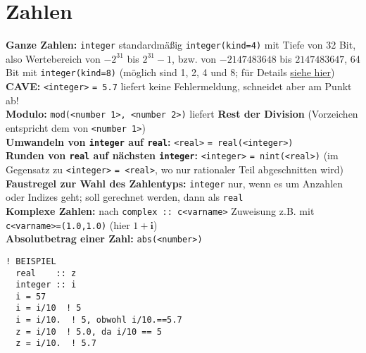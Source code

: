 \documentclass[a4paper, twocolumn]{scrarticle}
\begin{document}
\section{Zahlen}
\textbf{Ganze Zahlen:} \lstinline|integer| standardmäßig \lstinline|integer(kind=4)| mit Tiefe von 32 Bit, also Wertebereich von $-2^{31}$ bis $2^{31}-1$, bzw. von $-2147483648$ bis $2147483647$, 64 Bit mit \lstinline|integer(kind=8)| (möglich sind 1, 2, 4 und 8; für Details \href{http://earth.uni-muenster.de/~joergs/doc/f90/unix-um/dfum_034.html}{siehe hier})\\
\textbf{CAVE:} \lstinline|<integer>| \lstinline|= 5.7| liefert keine Fehlermeldung, schneidet aber am Punkt ab!\\
\textbf{Modulo:} \lstinline|mod(<number 1>, <number 2>)| liefert \textbf{Rest der Division} (Vorzeichen entspricht dem von \lstinline|<number 1>|) \\
\textbf{Umwandeln von \lstinline|integer| auf \lstinline|real|:} \lstinline|<real>| \lstinline|= real(<integer>)|\\
\textbf{Runden von \lstinline|real| auf nächsten \lstinline|integer|:} \lstinline|<integer>| \lstinline|= nint(<real>)| (im Gegensatz zu \lstinline|<integer>| \lstinline|= <real>|, wo nur rationaler Teil abgeschnitten wird)\\
\textbf{Faustregel zur Wahl des Zahlentyps:} \lstinline|integer| nur, wenn es um Anzahlen oder Indizes geht; soll gerechnet werden, dann als \lstinline|real|\\
\textbf{Komplexe Zahlen:} nach \lstinline|complex :: c<varname>| Zuweisung z.B. mit \lstinline|c<varname>=(1.0,1.0)| (hier $1+\textbf{i}$)\\
\textbf{Absolutbetrag einer Zahl:} \lstinline|abs(<number>)|
\begin{lstlisting}[caption={\bfseries Beispiel: CAVE - implizite Umwandlungen bei Division}]
  ! BEISPIEL
  real    :: z
  integer :: i
  i = 57
  i = i/10  ! 5
  i = i/10.  ! 5, obwohl i/10.==5.7
  z = i/10  ! 5.0, da i/10 == 5
  z = i/10.  ! 5.7
\end{lstlisting}
\end{document}
